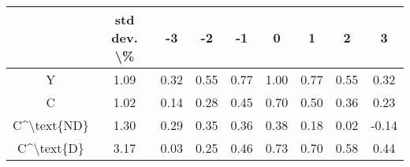 \begin{tabular}{ccccccccc}
\toprule
{} & std dev. \textbackslash \% &    -3 &    -2 &    -1 &     0 &     1 &     2 &      3 \\
\midrule
Y           &        1.09 &  0.32 &  0.55 &  0.77 &  1.00 &  0.77 &  0.55 &   0.32 \\
C           &        1.02 &  0.14 &  0.28 &  0.45 &  0.70 &  0.50 &  0.36 &   0.23 \\
C\textasciicircum \textbackslash text\{ND\} &        1.30 &  0.29 &  0.35 &  0.36 &  0.38 &  0.18 &  0.02 &  -0.14 \\
C\textasciicircum \textbackslash text\{D\}  &        3.17 &  0.03 &  0.25 &  0.46 &  0.73 &  0.70 &  0.58 &   0.44 \\
\bottomrule
\end{tabular}
